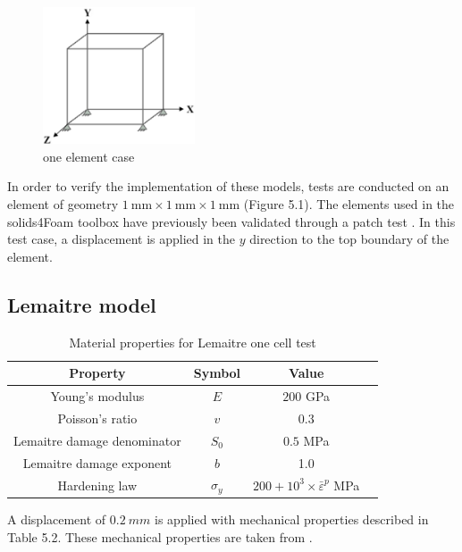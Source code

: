 \documentclass[sn-mathphys,Numbered,draft]{sn-jnl}%
\begin{document}
\begin{appendices}
\begin{figure}[htb]
\begin{center}
	\includegraphics[width=0.4\textwidth]{./figures/finiteVolumeImplementation/cubeCase.png}
\caption{one element case}
\label{fig:deforming body}
\end{center}
\end{figure}

In order to verify the implementation of these models, tests are conducted on an element of geometry $1\ \text{mm}\times1\ \text{mm}\times1\ \text{mm}$ (Figure 5.1). The elements used in the solids4Foam toolbox have previously been validated through a patch test \cite{cardiff_patch_nodate}. In this test case, a displacement is applied in the $y$ direction to the top boundary of the element.

\subsection{Lemaitre model}

\begin{table}[htb]
	\centering
		\begin{tabular}{cccc} \hline
			Property & Symbol & Value  \\ \hline 
			Young's modulus & $E$ & $200$ GPa \\
			Poisson's ratio & $v$ & $0.3$   \\
			Lemaitre damage denominator & $S_0$ & $0.5$ MPa  \\
			Lemaitre damage exponent & $b$ & 1.0  \\
			Hardening law & $\sigma_y$ & $200+10^3\times{\bar{\varepsilon}}^p$ MPa  \\
			\hline
		\end{tabular}
	\caption{Material properties for Lemaitre one cell test}
	\label{tab:material_properties}
\end{table}

A displacement of $0.2\ mm$ is applied with mechanical properties described in Table 5.2. These mechanical properties are taken from \citet{autay_numerical_2018}.


\end{appendices}
\end{document}

